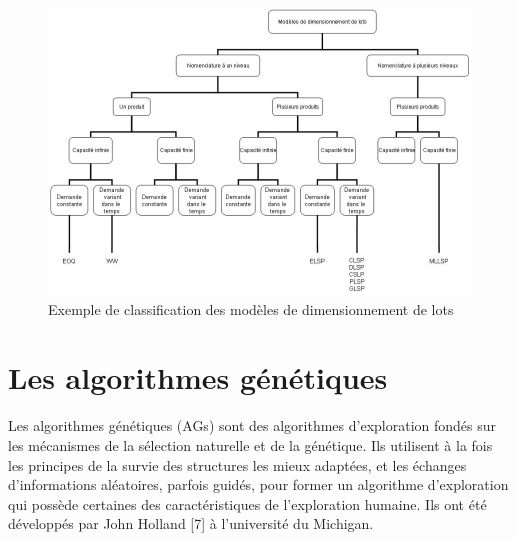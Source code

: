 \documentclass[12pt,a4paper]{article}
\begin{document}
	\begin{center}
		\begin{figure}[!h]
			\includegraphics[scale=.5]{img/classification_dimensionnement.png}
			\caption{Exemple de classification des modèles de dimensionnement de lots}
		\end{figure}
	\end{center}

	\newpage
	
	\section{Les algorithmes génétiques}
	Les algorithmes génétiques (AGs) sont des algorithmes d’exploration fondés sur les mécanismes de la sélection naturelle et de la génétique. Ils utilisent à la fois les principes de la survie des structures les mieux adaptées, et les échanges d’informations aléatoires, parfois guidés, pour former un algorithme d’exploration qui possède certaines des caractéristiques de l’exploration humaine. Ils ont été développés par John Holland [7] à l’université du Michigan.
\end{document}
